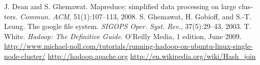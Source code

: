\documentclass{article}
\newcommand{\en}[1]{\foreignlanguage{english}{#1}}
\begin{document}
	\begin{thebibliography}{9}
		 \en{J. Dean and S. Ghemawat. Mapreduce: simplified data processing on large clusters. \textit{Commun. ACM}, 51(1):107–113, 2008.
}
 \en{
S. Ghemawat, H. Gobioff, and S.-T. Leung. The google file system. \textit{SIGOPS
Oper. Syst. Rev.}, 37(5):29–43, 2003.
}
 \en{
T. White. \textit{Hadoop: The Definitive Guide}. O’Reilly Media, 1 edition, June 2009.
}
 \en{\url{http://www.michael-noll.com/tutorials/running-hadoop-on-ubuntu-linux-single-node-cluster/}}
 \en{\url{http://hadoop.apache.org}}
 \en{\url{http://en.wikipedia.org/wiki/Hash_join}}


	\end{thebibliography}
\end{document}
